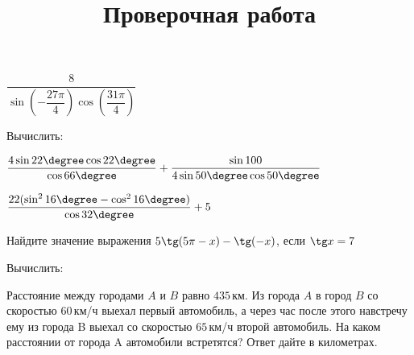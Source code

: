\begin{listofex}
\begin{enumcols}[itemcolumns=2]
		\item \( \dfrac{8}{\sin\left( -\dfrac{27\pi}{4}\right)\cos\left( \dfrac{31\pi}{4} \right) } \)
	\end{enumcols}
	\item Вычислить:
	\begin{enumcols}[itemcolumns=2]
		\item \( \dfrac{4\sin22\degree\cos22\degree}{\cos66\degree}+\dfrac{\sin100}{4\sin50\degree\cos50\degree} \)
		\item \( \dfrac{22(\sin^2 16\degree-\cos^2 16\degree)}{\cos32\degree}+5 \)
	\end{enumcols}
	\item Найдите значение выражения \( 5\tg(5\pi-x)-\tg(-x) \), если \( \tg x = 7 \)
	\item Вычислить:
	\begin{enumcols}[itemcolumns=2]
		\item {}
		\item {}
		\item {}
		\item {}
		\item {}
	\end{enumcols}
	\item Расстояние между городами \( A \) и \( B \) равно \( 435 \) км. Из города \( A \) в город \( B \) со скоростью \( 60 \) км/ч выехал первый автомобиль, а через час после этого навстречу ему из города B выехал со скоростью \( 65 \) км/ч второй автомобиль. На каком расстоянии от города A автомобили встретятся? Ответ дайте в километрах.
\end{listofex}
\newpage
\title{Проверочная работа}
